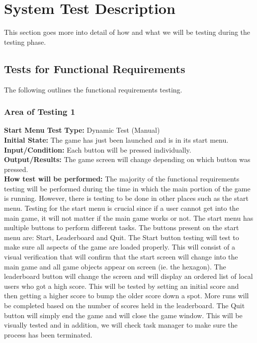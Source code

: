 \documentclass[12pt, titlepage]{article}
\begin{document}
\section{System Test Description}
\noindent This section goes more into detail of how and what we will be testing during the testing phase.
\subsection{Tests for Functional Requirements}
\noindent The following outlines the functional requirements testing.
\subsubsection{Area of Testing 1}
\noindent \textbf{Start Menu Test}
\textbf{Type:}  Dynamic Test (Manual)\\
\textbf{Initial State:}  The game has just been launched and is in its start menu.\\
\textbf{Input/Condition:} Each button will be pressed individually.\\
\textbf{Output/Results:} The game screen will change depending on which button                      was  pressed.\\
\textbf{How test will be performed:} The majority of the functional requirements testing will be performed during the time in which the main portion of the game is running. However, there is testing to be done in other places such as the start menu. Testing for the start menu is crucial since if a user cannot get into the main game, it will not matter if the main game works or not. The start menu has multiple buttons to perform different tasks. The buttons present on the start menu are: Start, Leaderboard and Quit. The Start button testing will test to make sure all aspects of the game are loaded properly. This will consist of a visual verification that will confirm that the start screen will change into the main game and all game objects appear on screen (ie. the hexagon). The leaderboard button will change the screen and will display an ordered list of local users who got a high score. This will be tested by setting an initial score and then getting a higher score to bump the older score down a spot. More runs will be completed based on the number of scores held in the leaderboard. The Quit button will simply end the game and will close the game window. This will be visually tested and in addition, we will check task manager to make sure the process has been terminated.
\end{document}
